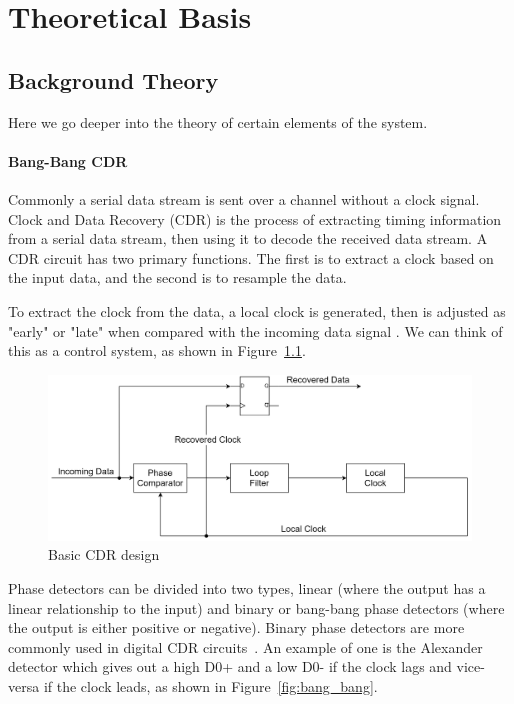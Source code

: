 \chapter{Theoretical Basis}

\section{Background Theory}%
\label{sec:background_theory}
Here we go deeper into the theory of certain elements of the system.

\subsubsection{Bang-Bang CDR}%
\label{ssub:clock_and_data_recovery}
Commonly a serial data stream is sent over a channel without a clock signal.
Clock and Data Recovery (CDR) is the process of extracting timing information
from a serial data stream, then using it to decode the received data stream.  A
CDR circuit has two primary functions. The first is to extract a clock based on
the input data, and the second is to resample the data. 

To extract the clock from the data, a local clock is generated, then is adjusted
as "early" or "late" when compared with the incoming data
signal \cite{sun1989analog}.  We can think of this as a control system, as
shown in Figure~\ref{fig:cdr_basic}.

\begin{figure}[ht]
    \centering
    \includegraphics[width=1\linewidth]{img/cdr_basic.png}
    \caption{Basic CDR design}%
    \label{fig:cdr_basic}
\end{figure}

Phase detectors can be divided into two types, linear (where the output has a
linear relationship to the input) and binary or bang-bang phase detectors (where the output
is either positive or negative). Binary phase detectors are more commonly used
in digital CDR circuits~\cite{ZHANG2015163}. An example of one is the
Alexander detector \cite{alexander1975clock} which gives out a high D0+ and a low D0- if the
clock lags and vice-versa if the clock leads, as shown in
Figure~\ref{fig:bang_bang}.

